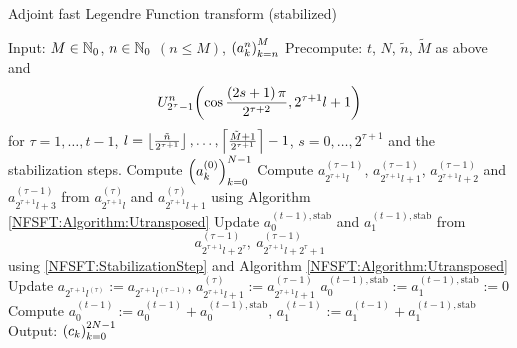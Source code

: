 \begin{algorithm}[htb]
  \caption{Adjoint fast Legendre Function transform (stabilized)}
  \label{NFSFT:Algorithm:adjointFLFT_stab}    
  \begin{algorithmic}
    \STATE Input:  $M \in \mathbb{N}_{0}$, $n \in \mathbb{N}_{0}$ $(n \le M)$, $\left(a_k^n\right)_{k=n}^{M}$
    \STATE Precompute: $t$, $N$, $\tilde{n}$, $\tilde{M}$ as above and \[U_{2^{\tau}-1}^{n}{\hspace{-0.4ex}}\left(\cos \frac{\left(2s+1\right)\pi}{2^{\tau+2}}, 2^{\tau+1}l+1\right)\] 
    \STATE {} for $\tau = 1,\ldots,t-1$, $l = \left\lfloor\frac{\tilde{n}}{2^{\tau+1}}\right\rfloor,\ldots,\left\lceil\frac{\tilde{M}+1}{2^{\tau+1}}\right\rceil-1$, 
    \STATE {} $s = 0,\ldots,2^{\tau+1}$ and the stabilization steps.
    \STATE Compute $\left(a_{k}^{(0)}\right)_{k=0}^{N-1}$ 
          \STATE Compute $a_{2^{\tau+1}l}^{(\tau-1)}$, $a_{2^{\tau+1}l+1}^{(\tau-1)}$, $a_{2^{\tau+1}l+2}^{(\tau-1)}$ and 
          $a_{2^{\tau+1}l+3}^{(\tau-1)}$ from $a_{2^{\tau+1}l}^{(\tau)}$ and $a_{2^{\tau+1}l+1}^{(\tau)}$ using 
          Algorithm \ref{NFSFT:Algorithm:Utransposed}
        \ELSE
          \STATE Update $a_{0}^{(t-1),\text{stab}}$ and $a_{1}^{(t-1),\text{stab}}$ from
            \[ 
              a_{2^{\tau+1}l+2^{\tau}}^{(\tau-1)},\ a_{2^{\tau+1}l+2^{\tau}+1}^{(\tau-1)}
            \] 
            using \eqref{NFSFT:StabilizationStep} and Algorithm \ref{NFSFT:Algorithm:Utransposed}
          \STATE Update $a_{2^{\tau+1}l^{(\tau)}} := a_{2^{\tau+1}l^{(\tau-1)}}$, $a_{2^{\tau+1}l+1}^{(\tau)} := a_{2^{\tau+1}l+1}^{(\tau-1)}$
        \ENDIF
      \ENDFOR
    \ENDFOR
    \STATE $a_{0}^{(t-1),\text{stab}} := a_{1}^{(t-1),\text{stab}} := 0$
    \STATE Compute $a_{0}^{(t-1)} := a_{0}^{(t-1)} + a_{0}^{(t-1),\text{stab}}$, $a_{1}^{(t-1)} := a_{1}^{(t-1)} + a_{1}^{(t-1),\text{stab}}$
    \STATE Output: $\left(c_{k}\right)_{k=0}^{2N-1}$
\end{algorithmic}
\end{algorithm}

